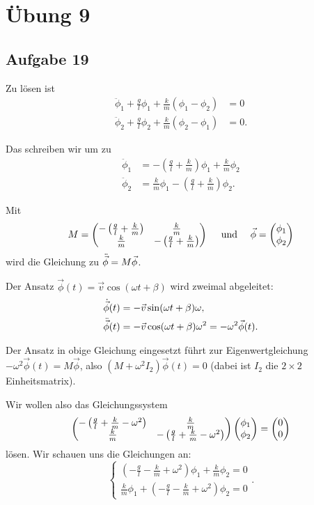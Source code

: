 \chapter*{Übung 9}
\section*{Aufgabe 19}

Zu lösen ist
\begin{align*}
	\ddot{\phi}_1 + \frac{g}{l} \phi_1 + \frac{k}{m} (\phi_1 - \phi_2) &= 0 \\
	\ddot{\phi}_2 + \frac{g}{l} \phi_2 + \frac{k}{m} (\phi_2 - \phi_1) &= 0 \text{.}
\end{align*}

Das schreiben wir um zu
\begin{align*}
	\ddot{\phi}_1 &= - \left( \frac{g}{l} + \frac{k}{m} \right) \phi_1 + \frac{k}{m} \phi_2 \\
	\ddot{\phi}_2 &= \frac{k}{m} \phi_1 - \left( \frac{g}{l} + \frac{k}{m} \right) \phi_2 \text{.}
\end{align*}

Mit 
\[
	M = \begin{pmatrix}
		- \left( \frac{g}{l} + \frac{k}{m} \right) & \frac{k}{m} \\
		\frac{k}{m} & - \left( \frac{g}{l} + \frac{k}{m} \right)
	\end{pmatrix}
	\quad \text{ und } \quad 
	\vec{\phi} = \begin{pmatrix} \phi_1 \\ \phi_2 \end{pmatrix}
\]
wird die Gleichung zu $\ddot{\vec{\phi}} = M \vec{\phi}$.

Der Ansatz $\vec{\phi}(t) = \vec{v} \cos(\omega t + \beta)$ wird zweimal abgeleitet:
\begin{align*}
	\dot{\vec{\phi}}(t) &= - \vec{v} \sin(\omega t + \beta) \omega \text{,} \\
	\ddot{\vec{\phi}}(t) &= - \vec{v} \cos(\omega t + \beta) \omega^2 = - \omega^2 \vec{\phi}(t) \text{.}	
\end{align*}

Der Ansatz in obige Gleichung eingesetzt führt zur Eigenwertgleichung $- \omega^2 \vec{\phi}(t) = M \vec{\phi}$, also $(M + \omega^2 I_2) \vec{\phi}(t) = 0$ (dabei ist $I_2$ die $2 \times 2$ Einheitsmatrix).

Wir wollen also das Gleichungssystem
\[
	\begin{pmatrix}
		- \left( \frac{g}{l} + \frac{k}{m} - \omega^2 \right) & \frac{k}{m} \\
		\frac{k}{m} & - \left( \frac{g}{l} + \frac{k}{m} - \omega^2 \right)
	\end{pmatrix}
	\begin{pmatrix} \phi_1 \\ \phi_2 \end{pmatrix}
	= \begin{pmatrix} 0 \\ 0 \end{pmatrix}
\]
lösen. Wir schauen uns die Gleichungen an:
\[
	\left\{ 
	\begin{array}{c}
		\left( -\frac{g}{l} - \frac{k}{m} + \omega^2 \right) \phi_1 + \frac{k}{m} \phi_2 = 0 \\
		\frac{k}{m} \phi_1 + \left( - \frac{g}{l} - \frac{k}{m} + \omega^2 \right) \phi_2 = 0	
	\end{array}
	\right. \text{.}
\]

